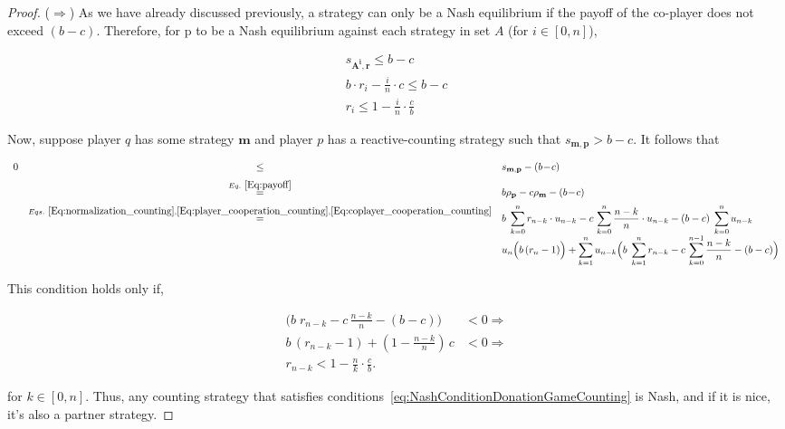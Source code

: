 \documentclass{article}
\theoremstyle{definition}
\begin{document}
\begin{proof}
($\Rightarrow$) As we have already discussed previously, a strategy can only be
a Nash equilibrium if the payoff of the co-player does not exceed $(b - c)$.
Therefore, for p to be a Nash equilibrium against each strategy in set $A$ (for
$i \in [0, n]$),

\begin{align}\label{eq:NashConditionDonationGameCounting}
  s_{\mathbf{A^{i}}, \mathbf{r}} \leq b - c \\ 
  b \cdot r_i - \frac{i}{n} \cdot c \leq   b - c \\
  r_i \leq 1 - \frac{i}{n} \cdot \frac{c}{b}
\end{align}

Now, suppose player $q$ has some strategy $\mathbf{m}$ and player $p$ has a reactive-counting
strategy such that $s_{\mathbf{m}, \mathbf{p}} > b\!-\!c$. It follows that

\begin{equation}
\begin{array}{rcl}
0 	&\le	&s_{\mathbf{m}, \mathbf{p}}-(b\!-\!c)\\[0.2cm]
  &\stackrel{Eq.~\eqref{Eq:payoff}}{=}	&b\rho_\mathbf{p} - c\rho_\mathbf{m}-(b\!-\!c)\\[0.2cm]
  &\stackrel{Eqs.~\eqref{Eq:normalization_counting}, \eqref{Eq:player_cooperation_counting}, \eqref{Eq:coplayer_cooperation_counting}}{=}	& 
  \displaystyle b\; \sum_{k=0}^{n} r_{n - k} \cdot u_{n - k} - c\, \sum_{k=0}^{n} \frac{n - k}{n} \cdot u_{n - k} - (b - c)\; \sum_{k=0}^{n} u_{n - k}\\[0.2cm]
  & & \displaystyle  u_{n} \Big(b\, (r_n - 1) \Big) +  \sum_{k=1}^{n} u_{n - k} \Big(b\; \sum_{k=1}^{n} r_{n - k} - c\, \sum_{k=0}^{n - 1} \frac{n - k}{n} - (b - c)\Big)
\end{array}
\end{equation}

This condition holds only if,

\begin{align}
  \Big(b\; r_{n - k} - c\, \frac{n - k}{n} - (b - c)\Big) & < 0 \Rightarrow \\ 
  b \, (r_{n - k} - 1) + (1 - \frac{n - k}{n})\, c & < 0 \Rightarrow \\ 
  r_{n - k} < 1 - \frac{n}{k} \cdot \frac{c}{b}.
\end{align}

for $k \in [0, n]$. Thus, any counting strategy that satisfies conditions~\eqref{eq:NashConditionDonationGameCounting}
is Nash, and if it is nice, it's also a partner strategy.
\end{proof}

~\\

\end{document}
